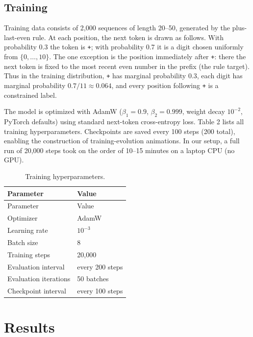 \documentclass[
  11pt,
  a4paper,
]{article}
\begin{document}
\subsection{Training}\label{training}

Training data consists of 2,000 sequences of length 20--50, generated by
the plus-last-even rule. At each position, the next token is drawn as
follows. With probability 0.3 the token is \texttt{+}; with probability
0.7 it is a digit chosen uniformly from \(\{0, \ldots, 10\}\). The one
exception is the position immediately after \texttt{+}: there the next
token is fixed to the most recent even number in the prefix (the rule
target). Thus in the training distribution, \texttt{+} has marginal
probability 0.3, each digit has marginal probability
\(0.7 / 11 \approx 0.064\), and every position following \texttt{+} is a
constrained label.

The model is optimized with AdamW (\(\beta_1 = 0.9\),
\(\beta_2 = 0.999\), weight decay \(10^{-2}\), PyTorch defaults) using
standard next-token cross-entropy loss. Table 2 lists all training
hyperparameters. Checkpoints are saved every 100 steps (200 total),
enabling the construction of training-evolution animations. In our
setup, a full run of 20,000 steps took on the order of 10--15 minutes on
a laptop CPU (no GPU).

\begin{longtable}[]{@{}ll@{}}
\caption{Training hyperparameters.}\label{tbl:training}\tabularnewline
\toprule\noalign{}
Parameter & Value \\
\midrule\noalign{}
\endfirsthead
\toprule\noalign{}
Parameter & Value \\
\midrule\noalign{}
\endhead
\bottomrule\noalign{}
\endlastfoot
Optimizer & AdamW \\
Learning rate & \(10^{-3}\) \\
Batch size & 8 \\
Training steps & 20,000 \\
Evaluation interval & every 200 steps \\
Evaluation iterations & 50 batches \\
Checkpoint interval & every 100 steps \\
\end{longtable}

\section{Results}\label{results}
\end{document}
